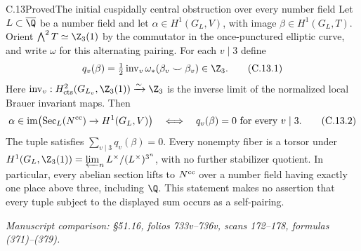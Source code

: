 \begin{statement}{C.13}{Proved}{The initial cuspidally central obstruction over every number field}
Let $L\subset\overline\Q$ be a number field and let
$\alpha\in H^1(G_L,V)$, with image $\beta\in H^1(G_L,T)$.
Orient $\bigwedge^2T\simeq\Z_3(1)$ by the commutator in
the once-punctured elliptic curve, and write $\omega$ for
this alternating pairing. For each $v\mid3$ define
\[
 q_v(\beta)=\tfrac12\operatorname{inv}_v
       \omega_*(\beta_v\smile\beta_v)\in\Z_3.
 \tag{C.13.1}
\]
Here $\operatorname{inv}_v:H^2_{\rm cts}(G_{L_v},\Z_3(1))
\xrightarrow{\sim}\Z_3$ is the inverse limit of the
normalized local Brauer invariant maps. Then
\[
 \alpha\in\operatorname{im}
   \bigl(\operatorname{Sec}_L(N^{\rm cc})\to H^1(G_L,V)\bigr)
 \quad\Longleftrightarrow\quad
             q_v(\beta)=0\text{ for every }v\mid3.
 \tag{C.13.2}
\]
The tuple satisfies $\sum_{v\mid3}q_v(\beta)=0$.
Every nonempty fiber is a torsor under
$H^1(G_L,\Z_3(1))=\varprojlim_n L^\times/(L^\times)^{3^n}$,
with no further stabilizer quotient. In particular, every
abelian section lifts to $N^{\rm cc}$ over a number field
having exactly one place above three, including $\Q$.
This statement makes no assertion that every tuple subject
to the displayed sum occurs as a self-pairing.
\par\smallskip\noindent\emph{Manuscript comparison: \S51.16,
folios 733v--736v, scans 172--178, formulas (371)--(379).}
\end{statement}

